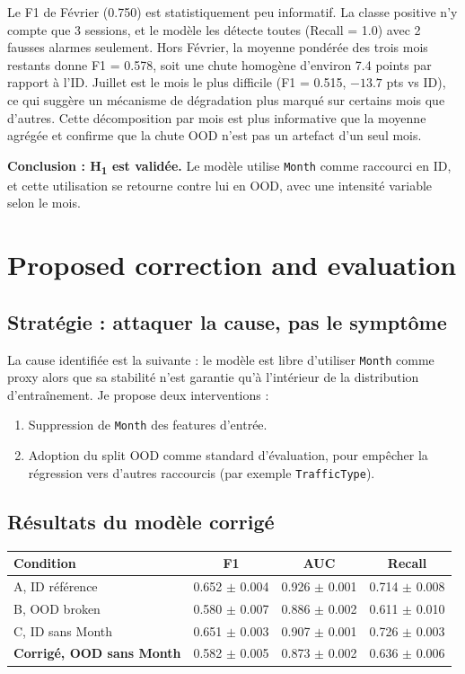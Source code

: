 \documentclass[11pt,a4paper]{article}
\newcommand{\code}[1]{\texttt{\small#1}}
\begin{document}
Le F1 de Février (0.750) est statistiquement peu informatif. La classe positive n'y compte que 3 sessions, et le modèle les détecte toutes (Recall = 1.0) avec 2 fausses alarmes seulement. Hors Février, la moyenne pondérée des trois mois restants donne F1 = 0.578, soit une chute homogène d'environ 7.4 points par rapport à l'ID. Juillet est le mois le plus difficile (F1 = 0.515, $-13.7$ pts vs ID), ce qui suggère un mécanisme de dégradation plus marqué sur certains mois que d'autres. Cette décomposition par mois est plus informative que la moyenne agrégée et confirme que la chute OOD n'est pas un artefact d'un seul mois.

\textbf{Conclusion : H\textsubscript{1} est validée.} Le modèle utilise \code{Month} comme raccourci en ID, et cette utilisation se retourne contre lui en OOD, avec une intensité variable selon le mois.

\section{Proposed correction and evaluation}

\subsection*{Stratégie : attaquer la cause, pas le symptôme}

La cause identifiée est la suivante : le modèle est libre d'utiliser \code{Month} comme proxy alors que sa stabilité n'est garantie qu'à l'intérieur de la distribution d'entraînement. Je propose deux interventions :

\begin{enumerate}
\item Suppression de \code{Month} des features d'entrée.
\item Adoption du split OOD comme standard d'évaluation, pour empêcher la régression vers d'autres raccourcis (par exemple \code{TrafficType}).
\end{enumerate}

\subsection*{Résultats du modèle corrigé}

\begin{center}
\begin{tabular}{lccc}
\toprule
\textbf{Condition} & \textbf{F1} & \textbf{AUC} & \textbf{Recall} \\
\midrule
A, ID référence              & 0.652 $\pm$ 0.004 & 0.926 $\pm$ 0.001 & 0.714 $\pm$ 0.008 \\
B, OOD broken                & 0.580 $\pm$ 0.007 & 0.886 $\pm$ 0.002 & 0.611 $\pm$ 0.010 \\
C, ID sans Month             & 0.651 $\pm$ 0.003 & 0.907 $\pm$ 0.001 & 0.726 $\pm$ 0.003 \\
\textbf{Corrigé, OOD sans Month} & 0.582 $\pm$ 0.005 & 0.873 $\pm$ 0.002 & 0.636 $\pm$ 0.006 \\
\bottomrule
\end{tabular}
\end{center}
\end{document}
